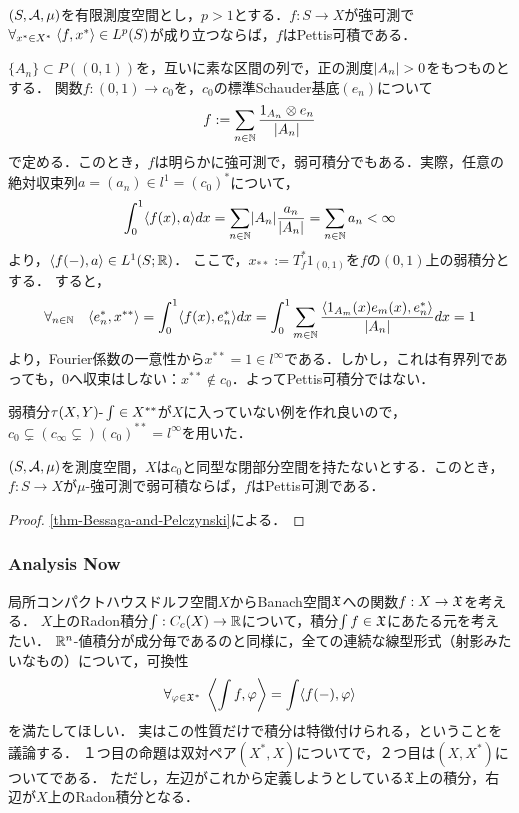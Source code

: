 \documentclass[uplatex,dvipdfmx]{jsreport}
\begin{document}
\begin{corollary}
    $(S,\mathcal{A},\mu)$を有限測度空間とし，$p>1$とする．$f:S\to X$が強可測で$\forall_{x^*\in X^*}\;\langle f,x^*\rangle\in L^p(S)$が成り立つならば，$f$はPettis可積である．
\end{corollary}

\begin{example}[弱可積であるがPettis可積分でない例]
    $\{A_n\}\subset P((0,1))$を，互いに素な区間の列で，正の測度$\lvert A_n\rvert>0$をもつものとする．
    関数$f:(0,1)\to c_0$を，$c_0$の標準Schauder基底$(e_n)$について
    \[f:=\sum_{n\in\mathbb{N}}\frac{1_{A_n}\otimes e_n}{\lvert A_n\rvert}\]
    で定める．このとき，$f$は明らかに強可測で，弱可積分でもある．実際，任意の絶対収束列$a=(a_n)\in l^1=(c_0)^*$について，
    \[\int^1_0\langle f(x),a\rangle dx=\sum_{n\in\mathbb{N}}\lvert A_n\rvert\frac{a_n}{\lvert A_n\rvert}=\sum_{n\in\mathbb{N}}a_n<\infty\]
    より，$\langle f(-),a\rangle\in L^1(S;\mathbb{R})$．
    ここで，$x_{**}:=T_f^*1_{(0,1)}$を$f$の$(0,1)$上の弱積分とする．
    すると，
    \[\forall_{n\in\mathbb{N}}\quad\langle e_n^*,x^{**}\rangle=\int^1_0\langle f(x),e_n^*\rangle dx=\int^1_0\sum_{m\in\mathbb{N}}\frac{\langle1_{A_m}(x)e_m(x),e_n^*\rangle}{\lvert A_n\rvert}dx=1\]
    より，Fourier係数の一意性から$x^{**}=1\in l^\infty$である．しかし，これは有界列であっても，$0$へ収束はしない：$x^{**}\notin c_0$．よってPettis可積分ではない．
\end{example}
\begin{remarks}
    弱積分$\tau(X,Y)\text{-}\int\in X^{**}$が$X$に入っていない例を作れ良いので，$c_0\subsetneq(c_\infty\subsetneq)(c_0)^{**}=l^\infty$を用いた．
\end{remarks}

\begin{proposition}
    $(S,\mathcal{A},\mu)$を測度空間，$X$は$c_0$と同型な閉部分空間を持たないとする．このとき，$f:S\to X$が$\mu$-強可測で弱可積ならば，$f$はPettis可測である．
\end{proposition}
\begin{proof}
    \ref{thm-Bessaga-and-Pelczynski}による．
\end{proof}

\subsubsection{Analysis Now}

\begin{tcolorbox}[colframe=ForestGreen, colback=ForestGreen!10!white,breakable,colbacktitle=ForestGreen!40!white,coltitle=black,fonttitle=\bfseries\sffamily,
    title=Pettis積分]
    局所コンパクトハウスドルフ空間$X$からBanach空間$\mathfrak{X}$への関数$f:X\to\mathfrak{X}$を考える．
    $X$上のRadon積分$\int:C_c(X)\to\mathbb{R}$について，積分$\int f\in\mathfrak{X}$にあたる元を考えたい．
    $\mathbb{R}^n$-値積分が成分毎であるのと同様に，全ての連続な線型形式（射影みたいなもの）について，可換性
    \[\forall_{\varphi\in\mathfrak{X}^*}\;\left\langle\int f,\varphi\right\rangle=\int\langle f(-),\varphi\rangle\]
    を満たしてほしい．
    実はこの性質だけで積分は特徴付けられる，ということを議論する．
    １つ目の命題は双対ペア$(X^*,X)$についてで，２つ目は$(X,X^*)$についてである．
    ただし，左辺がこれから定義しようとしている$\mathfrak{X}$上の積分，右辺が$X$上のRadon積分となる．
\end{tcolorbox}
\end{document}
